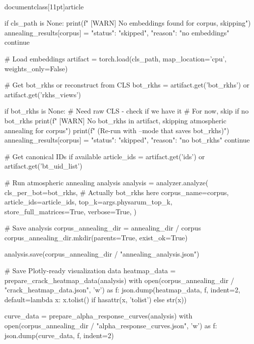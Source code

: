 \\documentclass[11pt]{article}
\begin{document}
\begin{CodeBlock}
                if cls_path is None:
                    print(f"  [WARN] No embeddings found for {corpus}, skipping")
                    annealing_results[corpus] = {"status": "skipped", "reason": "no embeddings"}
                    continue
                
                # Load embeddings
                artifact = torch.load(cls_path, map_location='cpu', weights_only=False)
                
                # Get bot_rkhs or reconstruct from CLS
                bot_rkhs = artifact.get('bot_rkhs') or artifact.get('rkhs_views')
                
                if bot_rkhs is None:
                    # Need raw CLS - check if we have it
                    # For now, skip if no bot_rkhs
                    print(f"  [WARN] No bot_rkhs in artifact, skipping atmospheric annealing for {corpus}")
                    print(f"  (Re-run with --mode that saves bot_rkhs)")
                    annealing_results[corpus] = {"status": "skipped", "reason": "no bot_rkhs"}
                    continue
                
                # Get canonical IDs if available
                article_ids = artifact.get('ids') or artifact.get('bt_uid_list')

                # Run atmospheric annealing analysis
                analysis = analyzer.analyze(
                    cls_per_bot=bot_rkhs,  # Actually bot_rkhs here
                    corpus_name=corpus,
                    article_ids=article_ids,
                    top_k=args.physarum_top_k,
                    store_full_matrices=True,
                    verbose=True,
                )
                
                # Save analysis
                corpus_annealing_dir = annealing_dir / corpus
                corpus_annealing_dir.mkdir(parents=True, exist_ok=True)

                analysis.save(corpus_annealing_dir / "annealing_analysis.json")
                
                # Save Plotly-ready visualization data
                heatmap_data = prepare_crack_heatmap_data(analysis)
                with open(corpus_annealing_dir / "crack_heatmap_data.json", 'w') as f:
                    json.dump(heatmap_data, f, indent=2, default=lambda x: x.tolist() if hasattr(x, 'tolist') else str(x))

                curve_data = prepare_alpha_response_curves(analysis)
                with open(corpus_annealing_dir / "alpha_response_curves.json", 'w') as f:
                    json.dump(curve_data, f, indent=2)


\end{CodeBlock}
\end{document}
